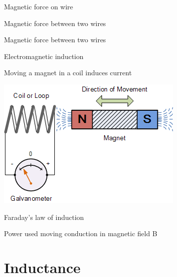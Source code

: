 \documentclass[compress]{beamer}
\begin{document}
{
    \begin{frame}{Magnetic force on wire}
    \end{frame}
}

{
    \begin{frame}{Magnetic force between two wires}
    \end{frame}
}

{
    \begin{frame}{Magnetic force between two wires}
    \end{frame}
}

\begin{frame}{Electromagnetic induction}

  Moving a magnet in a coil induces current


    \begin{center}
        \includegraphics[width=0.6\linewidth]{part2/figs/image29}


    \end{center}
\end{frame}

{
    \begin{frame}{Faraday's law of induction}
    \end{frame}
}

{
    \begin{frame}{Power used moving conduction in magnetic field B}
    \end{frame}
}

\section{Inductance}
\end{document}
